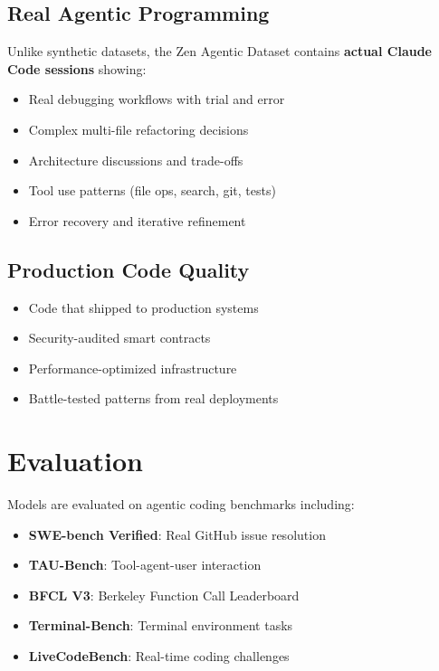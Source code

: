 \documentclass[11pt,a4paper]{article}
\begin{document}
\subsection{Real Agentic Programming}

Unlike synthetic datasets, the Zen Agentic Dataset contains \textbf{actual Claude Code sessions} showing:
\begin{itemize}
    \item Real debugging workflows with trial and error
    \item Complex multi-file refactoring decisions
    \item Architecture discussions and trade-offs
    \item Tool use patterns (file ops, search, git, tests)
    \item Error recovery and iterative refinement
\end{itemize}

\subsection{Production Code Quality}
\begin{itemize}
    \item Code that shipped to production systems
    \item Security-audited smart contracts
    \item Performance-optimized infrastructure
    \item Battle-tested patterns from real deployments
\end{itemize}

\section{Evaluation}

Models are evaluated on agentic coding benchmarks including:
\begin{itemize}
    \item \textbf{SWE-bench Verified}: Real GitHub issue resolution
    \item \textbf{TAU-Bench}: Tool-agent-user interaction
    \item \textbf{BFCL V3}: Berkeley Function Call Leaderboard
    \item \textbf{Terminal-Bench}: Terminal environment tasks
    \item \textbf{LiveCodeBench}: Real-time coding challenges
\end{itemize}
\end{document}
